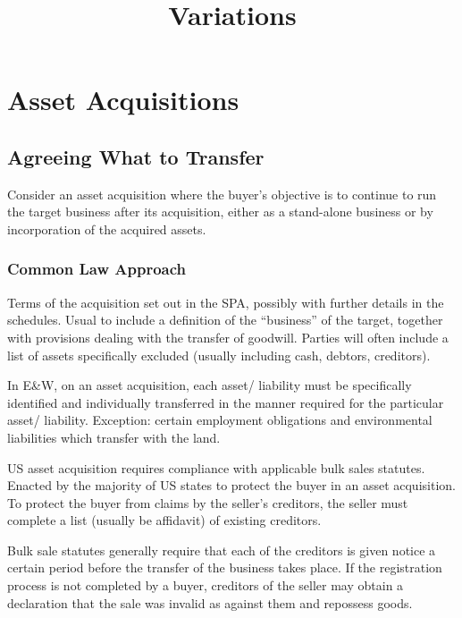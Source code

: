 \documentclass[
]{article}
\title{Variations}
\author{}
\date{}
\begin{document}
\maketitle

{
\setcounter{tocdepth}{3}
\tableofcontents
}
\hypertarget{asset-acquisitions}{%
\section{Asset Acquisitions}\label{asset-acquisitions}}

\hypertarget{agreeing-what-to-transfer}{%
\subsection{Agreeing What to Transfer}\label{agreeing-what-to-transfer}}

Consider an asset acquisition where the buyer's objective is to continue
to run the target business after its acquisition, either as a
stand-alone business or by incorporation of the acquired assets.

\hypertarget{common-law-approach}{%
\subsubsection{Common Law Approach}\label{common-law-approach}}

Terms of the acquisition set out in the SPA, possibly with further
details in the schedules. Usual to include a definition of the
``business'' of the target, together with provisions dealing with the
transfer of goodwill. Parties will often include a list of assets
specifically excluded (usually including cash, debtors, creditors).

In E\&W, on an asset acquisition, each asset/ liability must be
specifically identified and individually transferred in the manner
required for the particular asset/ liability. Exception: certain
employment obligations and environmental liabilities which transfer with
the land.

US asset acquisition requires compliance with applicable bulk sales
statutes. Enacted by the majority of US states to protect the buyer in
an asset acquisition. To protect the buyer from claims by the seller's
creditors, the seller must complete a list (usually be affidavit) of
existing creditors.

Bulk sale statutes generally require that each of the creditors is given
notice a certain period before the transfer of the business takes place.
If the registration process is not completed by a buyer, creditors of
the seller may obtain a declaration that the sale was invalid as against
them and repossess goods.
\end{document}
